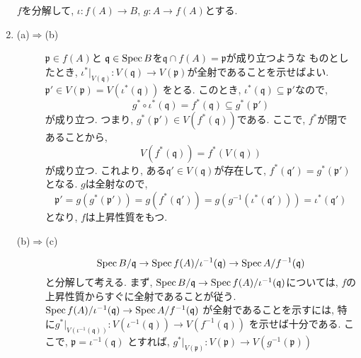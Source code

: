 \documentclass[dvipdfmx]{jsarticle}
\begin{document}
    \begin{problem}
        \begin{enumerate}
            $f$を分解して, $\iota: f(A) \to B$, $g: A \to f(A)$とする.
            \item \begin{description}
                \item[(a)$\Rightarrow$(b)]
                $\mathfrak{p} \in f(A)$と
                $\mathfrak{q} \in \operatorname{Spec}{B}$を$\mathfrak{q} \cap f(A) = \mathfrak{p}$が成り立つような
                ものとしたとき, $\iota^\ast|_{V(\mathfrak{q})}: V(\mathfrak{q}) \to V(\mathfrak{p})$が全射であることを示せばよい.
                $\mathfrak{p}' \in V(\mathfrak{p}) = V(\iota^{\ast}(\mathfrak{q}))$
                をとる.
                このとき, $\iota^{\ast}(\mathfrak{q}) \subseteq \mathfrak{p}'$なので,
                \[
                    g^\ast\circ \iota^\ast(\mathfrak{q}) = f^\ast(\mathfrak{q}) \subseteq g^\ast(\mathfrak{p}')
                \]
                が成り立つ.
                つまり, $g^\ast(\mathfrak{p'}) \in V(f^\ast(\mathfrak{q}))$である.
                ここで, $f^\ast$が閉であることから,
                \[
                    V(f^\ast(\mathfrak{q})) = f^\ast(V(\mathfrak{q}))
                \]
                が成り立つ.
                これより, ある$\mathfrak{q}' \in V(\mathfrak{q})$が存在して,
                $f^\ast(\mathfrak{q}') = g^\ast(\mathfrak{p}')$となる.
                $g$は全射なので,
                \[
                    \mathfrak{p}' = g(g^{\ast}(\mathfrak{p}')) = g(f^{\ast}(\mathfrak{q}')) = g(g^{-1}(\iota^\ast(\mathfrak{q}')))= \iota^\ast(\mathfrak{q}')
                \]
                となり, $f$は上昇性質をもつ.
                \item[(b)$\Rightarrow$(c)]
                \[
                    \operatorname{Spec}{B/\mathfrak{q}} \to \operatorname{Spec}{f(A)/\iota^{-1}(\mathfrak{q})} \to \operatorname{Spec}{A/f^{-1}(\mathfrak{q})}
                \]
                と分解して考える.
                まず, $\operatorname{Spec}{B/\mathfrak{q}} \to \operatorname{Spec}{f(A)/\iota^{-1}(\mathfrak{q})}$については,
                $f$の上昇性質からすぐに全射であることが従う.
                $\operatorname{Spec}{f(A)/\iota^{-1}(\mathfrak{q})} \to \operatorname{Spec}{A/f^{-1}(\mathfrak{q})}$
                が全射であることを示すには,
                特に$g^\ast|_{V(\iota^{-1}(\mathfrak{q}))}: V(\iota^{-1}(\mathfrak{q})) \to V(f^{-1}(\mathfrak{q}))$
                を示せば十分である.
                ここで, $\mathfrak{p} = \iota^{-1}(\mathfrak{q})$
                とすれば, $g^\ast|_{V(\mathfrak{p})}: V(\mathfrak{p}) \to V(g^{-1}(\mathfrak{p}))$

\end{description}
\end{enumerate}
\end{problem}
\end{document}
